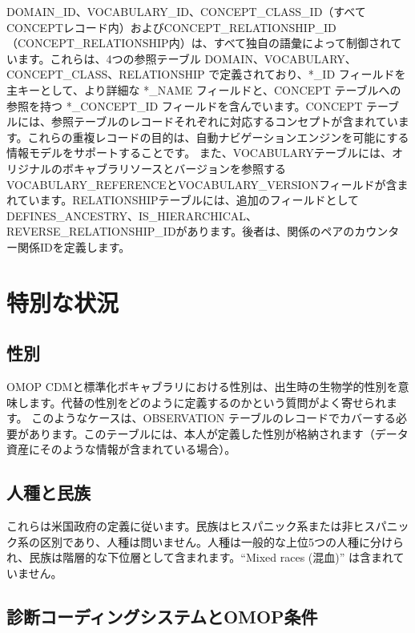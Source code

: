 \documentclass[
  11pt]{book}
\theoremstyle{definition}
\theoremstyle{definition}
\theoremstyle{definition}
\theoremstyle{definition}
\theoremstyle{remark}
\begin{document}
DOMAIN\_ID、VOCABULARY\_ID、CONCEPT\_CLASS\_ID（すべてCONCEPTレコード内）およびCONCEPT\_RELATIONSHIP\_ID（CONCEPT\_RELATIONSHIP内）は、すべて独自の語彙によって制御されています。これらは、4つの参照テーブル DOMAIN、VOCABULARY、CONCEPT\_CLASS、RELATIONSHIP で定義されており、*\_ID フィールドを主キーとして、より詳細な *\_NAME フィールドと、CONCEPT テーブルへの参照を持つ *\_CONCEPT\_ID フィールドを含んでいます。CONCEPT テーブルには、参照テーブルのレコードそれぞれに対応するコンセプトが含まれています。これらの重複レコードの目的は、自動ナビゲーションエンジンを可能にする情報モデルをサポートすることです。 また、VOCABULARYテーブルには、オリジナルのボキャブラリソースとバージョンを参照するVOCABULARY\_REFERENCEとVOCABULARY\_VERSIONフィールドが含まれています。RELATIONSHIPテーブルには、追加のフィールドとしてDEFINES\_ANCESTRY、IS\_HIERARCHICAL、REVERSE\_RELATIONSHIP\_IDがあります。後者は、関係のペアのカウンター関係IDを定義します。

\section{特別な状況}\label{specialSituations}

\subsection{性別}\label{ux6027ux5225}

OMOP CDMと標準化ボキャブラリにおける性別は、出生時の生物学的性別を意味します。代替の性別をどのように定義するのかという質問がよく寄せられます。 このようなケースは、OBSERVATION テーブルのレコードでカバーする必要があります。このテーブルには、本人が定義した性別が格納されます（データ資産にそのような情報が含まれている場合）。

\subsection{人種と民族}\label{ux4ebaux7a2eux3068ux6c11ux65cf}

これらは米国政府の定義に従います。民族はヒスパニック系または非ヒスパニック系の区別であり、人種は問いません。人種は一般的な上位5つの人種に分けられ、民族は階層的な下位層として含まれます。``Mixed races (混血)'' は含まれていません。

\subsection{診断コーディングシステムとOMOP条件}\label{ux8a3aux65adux30b3ux30fcux30c7ux30a3ux30f3ux30b0ux30b7ux30b9ux30c6ux30e0ux3068omopux6761ux4ef6}
\end{document}
